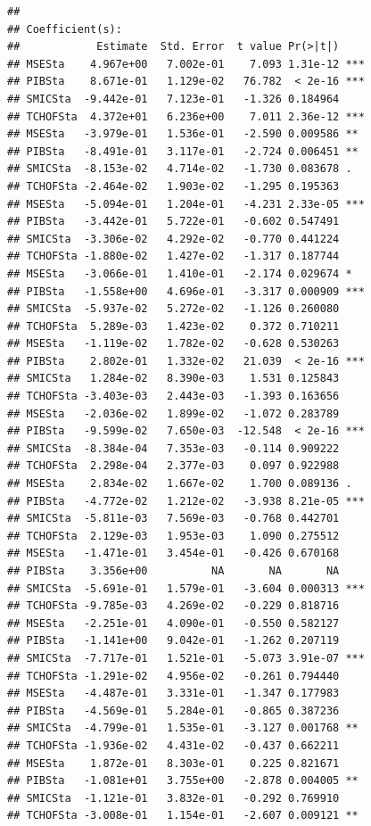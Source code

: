 \documentclass[11pt,]{article}
\begin{document}
\begin{verbatim}
## 
## Coefficient(s):
##            Estimate  Std. Error  t value Pr(>|t|)    
## MSESta    4.967e+00   7.002e-01    7.093 1.31e-12 ***
## PIBSta    8.671e-01   1.129e-02   76.782  < 2e-16 ***
## SMICSta  -9.442e-01   7.123e-01   -1.326 0.184964    
## TCHOFSta  4.372e+01   6.236e+00    7.011 2.36e-12 ***
## MSESta   -3.979e-01   1.536e-01   -2.590 0.009586 ** 
## PIBSta   -8.491e-01   3.117e-01   -2.724 0.006451 ** 
## SMICSta  -8.153e-02   4.714e-02   -1.730 0.083678 .  
## TCHOFSta -2.464e-02   1.903e-02   -1.295 0.195363    
## MSESta   -5.094e-01   1.204e-01   -4.231 2.33e-05 ***
## PIBSta   -3.442e-01   5.722e-01   -0.602 0.547491    
## SMICSta  -3.306e-02   4.292e-02   -0.770 0.441224    
## TCHOFSta -1.880e-02   1.427e-02   -1.317 0.187744    
## MSESta   -3.066e-01   1.410e-01   -2.174 0.029674 *  
## PIBSta   -1.558e+00   4.696e-01   -3.317 0.000909 ***
## SMICSta  -5.937e-02   5.272e-02   -1.126 0.260080    
## TCHOFSta  5.289e-03   1.423e-02    0.372 0.710211    
## MSESta   -1.119e-02   1.782e-02   -0.628 0.530263    
## PIBSta    2.802e-01   1.332e-02   21.039  < 2e-16 ***
## SMICSta   1.284e-02   8.390e-03    1.531 0.125843    
## TCHOFSta -3.403e-03   2.443e-03   -1.393 0.163656    
## MSESta   -2.036e-02   1.899e-02   -1.072 0.283789    
## PIBSta   -9.599e-02   7.650e-03  -12.548  < 2e-16 ***
## SMICSta  -8.384e-04   7.353e-03   -0.114 0.909222    
## TCHOFSta  2.298e-04   2.377e-03    0.097 0.922988    
## MSESta    2.834e-02   1.667e-02    1.700 0.089136 .  
## PIBSta   -4.772e-02   1.212e-02   -3.938 8.21e-05 ***
## SMICSta  -5.811e-03   7.569e-03   -0.768 0.442701    
## TCHOFSta  2.129e-03   1.953e-03    1.090 0.275512    
## MSESta   -1.471e-01   3.454e-01   -0.426 0.670168    
## PIBSta    3.356e+00          NA       NA       NA    
## SMICSta  -5.691e-01   1.579e-01   -3.604 0.000313 ***
## TCHOFSta -9.785e-03   4.269e-02   -0.229 0.818716    
## MSESta   -2.251e-01   4.090e-01   -0.550 0.582127    
## PIBSta   -1.141e+00   9.042e-01   -1.262 0.207119    
## SMICSta  -7.717e-01   1.521e-01   -5.073 3.91e-07 ***
## TCHOFSta -1.291e-02   4.956e-02   -0.261 0.794440    
## MSESta   -4.487e-01   3.331e-01   -1.347 0.177983    
## PIBSta   -4.569e-01   5.284e-01   -0.865 0.387236    
## SMICSta  -4.799e-01   1.535e-01   -3.127 0.001768 ** 
## TCHOFSta -1.936e-02   4.431e-02   -0.437 0.662211    
## MSESta    1.872e-01   8.303e-01    0.225 0.821671    
## PIBSta   -1.081e+01   3.755e+00   -2.878 0.004005 ** 
## SMICSta  -1.121e-01   3.832e-01   -0.292 0.769910    
## TCHOFSta -3.008e-01   1.154e-01   -2.607 0.009121 ** 

\end{verbatim}
\end{document}
